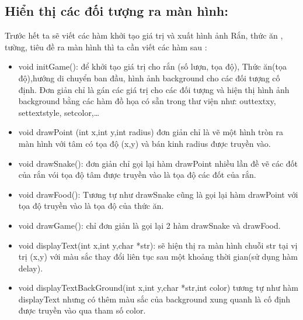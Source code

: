 \documentclass[13pt,a4paper]{article}
\begin{document}
\subsection{Hiển thị các đối tượng ra màn hình:}
\indent Trước hết ta sẽ viết các hàm khởi tạo giá trị và xuất hình ảnh Rắn, thức ăn , tường, tiêu đề ra màn hình thì ta cần viết các hàm sau :
\begin{itemize}

\item void initGame(): để khởi tạo giá trị cho rắn (số lượn, tọa độ), Thức ăn(tọa độ),hướng di chuyển ban đầu, hình ảnh background cho các đối tượng cố định. Đơn giản chỉ là gán các giá trị cho các đối tượng và hiện thị hình ảnh background bằng các hàm đồ họa có sẵn trong thư viện như: outtextxy, settextstyle, setcolor,…
\item void drawPoint (int x,int y,int radius) đơn giản chỉ là vẽ một hình tròn ra màn hình với tâm có tọa độ (x,y) và bán kinh radius được truyền vào.
\item void drawSnake(): đơn giản chỉ gọi lại hàm drawPoint nhiều lần đề vẽ các đốt của rắn vói tọa độ tâm được truyền vào là tọa độ các đốt của rắn.
\item void drawFood(): Tương tự như drawSnake cũng là gọi lại hàm drawPoint với tọa độ truyền vào là tọa độ của thức ăn.
\item void drawGame(): chỉ đơn giản là gọi lại 2 hàm drawSnake và drawFood.
\item void displayText(int x,int y,char *str): sẽ hiện thị ra màn hình chuỗi str tại vị trị (x,y) với màu sắc thay đổi liên tục sau một khoảng thời gian(sử dụng hàm delay).
\item void displayTextBackGround(int x,int y,char *str,int color) tương tự như hàm displayText nhưng có thêm màu sắc của background xung quanh là cố định được truyền vào qua tham số color.

\end{itemize}
\end{document}
